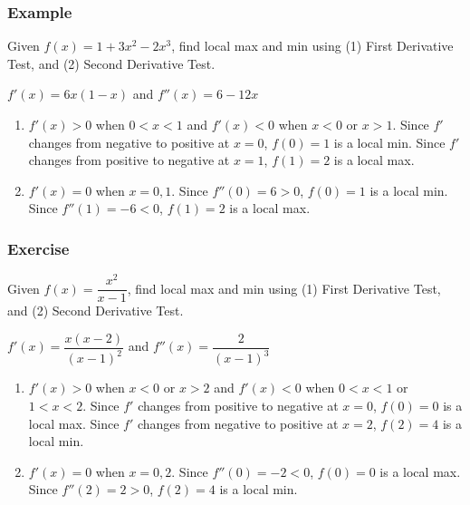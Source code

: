\documentclass[t]{beamer}
\theoremstyle{plain}
\theoremstyle{definition}
\begin{document}
\begin{frame}
\frametitle{Example}

Given $f(x) = 1 + 3x^2 - 2x^3$,  find local max and min using (1) First Derivative Test, and (2) Second Derivative Test. \pause

\vspace{1em}

$f'(x) = 6x (1-x)$ and $f''(x) = 6 - 12x$

\begin{enumerate}
	\item $f'(x) > 0$ when $0 < x < 1$ and $f'(x) < 0$ when $x<0$ or $x>1$.  Since $f'$ changes from negative to positive at $x=0$, $f(0) = 1$ is a local min.   Since $f'$ changes from positive to negative at $x=1$, $f(1)=2$ is a local max.
	\item $f'(x) = 0$ when $x=0,1$.    Since $f''(0) = 6 > 0$, $f(0) = 1$ is a local min.   Since $f''(1) = -6 < 0$, $f(1) = 2$ is a local max. 
\end{enumerate}

\end{frame}

\begin{frame}

\frametitle{Exercise}

Given $f(x) = \dfrac{x^2}{x-1}$,  find local max and min using (1) First Derivative Test, and (2) Second Derivative Test. \pause

\vspace{1em}

$f'(x) = \dfrac{x(x-2)}{(x-1)^2}$ and $f''(x) = \dfrac{2}{(x-1)^3}$

\begin{enumerate}
	\item $f'(x) > 0$ when $x < 0$ or $x > 2$ and $f'(x) < 0$ when $0 < x < 1$ or $1 < x < 2$.  Since $f'$ changes from positive to negative at $x=0$, $f(0) = 0$ is a local max.   Since $f'$ changes from negative to positive at $x=2$, $f(2)=4$ is a local min.
	\item $f'(x) = 0$ when $x=0,2$.    Since $f''(0) = -2  < 0$, $f(0) = 0$ is a local max.   Since $f''(2) = 2 > 0$, $f(2) = 4$ is a local min. 
\end{enumerate}


\end{frame}
\end{document}
